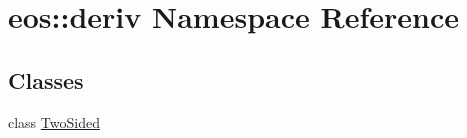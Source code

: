 \hypertarget{namespaceeos_1_1deriv}{
\section{eos::deriv Namespace Reference}
\label{namespaceeos_1_1deriv}
}
\subsection*{Classes}
\begin{DoxyCompactItemize}
\item 
class \hyperlink{classeos_1_1deriv_1_1TwoSided}{TwoSided}
\end{DoxyCompactItemize}
